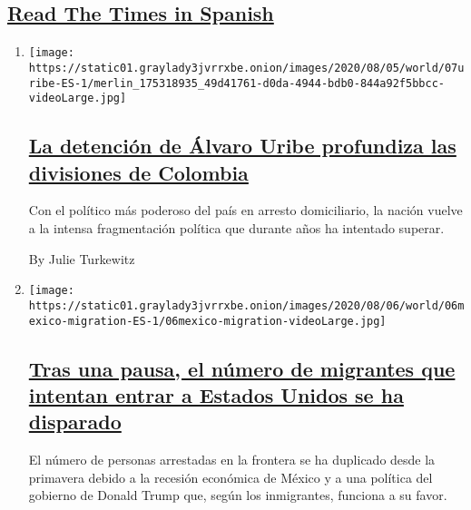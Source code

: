 \hypertarget{read-the-times-in-spanish}{%
\subsection{\texorpdfstring{\protect\hyperlink{}{Read The Times in
Spanish}}{Read The Times in Spanish}}\label{read-the-times-in-spanish}}

\begin{enumerate}
\def\labelenumi{\arabic{enumi}.}
\item
  \texttt{[image: https://static01.graylady3jvrrxbe.onion/images/2020/08/05/world/07uribe-ES-1/merlin\_175318935\_49d41761-d0da-4944-bdb0-844a92f5bbcc-videoLarge.jpg]}

  \hypertarget{la-detenciuxf3n-de-uxe1lvaro-uribe-profundiza-las-divisiones-de-colombia}{%
  \subsection{\texorpdfstring{\href{/es/2020/08/07/espanol/america-latina/alvaro-uribe-colombia.html}{La
  detención de Álvaro Uribe profundiza las divisiones de
  Colombia}}{La detención de Álvaro Uribe profundiza las divisiones de Colombia}}\label{la-detenciuxf3n-de-uxe1lvaro-uribe-profundiza-las-divisiones-de-colombia}}

  Con el político más poderoso del país en arresto domiciliario, la
  nación vuelve a la intensa fragmentación política que durante años ha
  intentado superar.

  By Julie Turkewitz
\item
  \texttt{[image: https://static01.graylady3jvrrxbe.onion/images/2020/08/06/world/06mexico-migration-ES-1/06mexico-migration-videoLarge.jpg]}

  \hypertarget{tras-una-pausa-el-nuxfamero-de-migrantes-que-intentan-entrar-a-estados-unidos-se-ha-disparado}{%
  \subsection{\texorpdfstring{\href{/es/2020/08/06/espanol/america-latina/migracion-estados-unidos.html}{Tras
  una pausa, el número de migrantes que intentan entrar a Estados Unidos
  se ha
  disparado}}{Tras una pausa, el número de migrantes que intentan entrar a Estados Unidos se ha disparado}}\label{tras-una-pausa-el-nuxfamero-de-migrantes-que-intentan-entrar-a-estados-unidos-se-ha-disparado}}

  El número de personas arrestadas en la frontera se ha duplicado desde
  la primavera debido a la recesión económica de México y a una política
  del gobierno de Donald Trump que, según los inmigrantes, funciona a su
  favor.


\end{enumerate}
